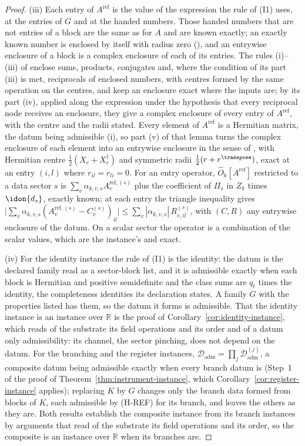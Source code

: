 \begin{proof}
(iii) Each entry of $A^{\mathrm{ref}}$ is the value of the expression the
rule of (I1) uses, at the entries of $G$ and at the handed numbers. Those
handed numbers that are not entries of a block are the same as for $A$ and
are known exactly; an exactly known number is enclosed by itself with radius
zero (), and an entrywise enclosure of a
block is a complex enclosure of each of its entries. The rules (i)--(iii) of
 enclose sums, products, conjugates
and, where the condition of its part (iii) is met, reciprocals of enclosed
numbers, with centres formed by the same operation on the centres, and keep
an enclosure exact where the inputs are; by its part (iv), applied along the
expression under the hypothesis that every reciprocal node receives an
enclosure, they give a complex enclosure of every entry of
$A^{\mathrm{ref}}$, with the centre and the radii stated. Every element of
$A^{\mathrm{ref}}$ is a Hermitian matrix, the datum being admissible (i), so
part (v) of that lemma turns the complex enclosure of each element into an
entrywise enclosure in the sense of ,
with Hermitian centre $\tfrac12(X_c+X_c^{\dagger})$ and symmetric radii
$\tfrac12(r+r^{\transpose})$, exact at an entry $(i,l)$ where
$r_{il}=r_{li}=0$. For an entry
operator, $\hat O_k[A^{\mathrm{ref}}]$ restricted to a data sector $s$ is
$\sum_v\alpha_{k,v,s}A^{\mathrm{ref},(s)}_v$ plus the coefficient of $\Pi_s$
in $Z_k$ times $\idon{d_s}$, exactly known; at each entry the triangle
inequality gives $\big|\sum_v\alpha_{k,v,s}(A^{\mathrm{ref},(s)}_v
-C^{(s)}_v)_{il}\big|\le\sum_v|\alpha_{k,v,s}|\,R^{(s)}_{v,il}$, with
$(C,R)$ any entrywise enclosure of the datum. On a scalar sector the operator is a
combination of the scalar values, which are the instance's and exact.

(iv) For the identity instance the rule of (I1) is the identity: the datum
is the declared family read as a sector-block list, and it is admissible
exactly when each block is Hermitian and positive semidefinite and the class
sums are $q_t$ times the identity, the completeness identities its
declaration states. A family $G$ with the properties listed has them, so the
datum it forms is admissible. That the identity instance is an instance over
$\mathbb{R}$ is the proof of Corollary~\ref{cor:identity-instance}, which
reads of the substrate its field operations and its order and of a datum
only admissibility: its channel, the sector pinching, does not depend on
the datum. For the branching and the register instances,
$\mathcal{D}_{\mathrm{adm}}=\prod_j\mathcal{D}^{(j)}_{\mathrm{adm}}$, a
composite datum being admissible exactly when every branch datum is (Step~1
of the proof of Theorem~\ref{thm:instrument-instance}, which
Corollary~\ref{cor:register-instance} applies); replacing $K$ by $G$ changes
only the branch data formed from blocks of $K$, each admissible by (H-REF)
for its branch, and leaves the others as they are. Both results establish
the composite instance from its branch instances by arguments that read of
the substrate its field operations and its order, so the composite is an
instance over $\mathbb{R}$ when its branches are.


\end{proof}
